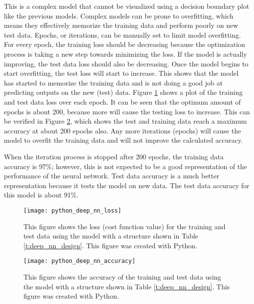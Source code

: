 This is a complex model that cannot be visualized using a decision boundary plot like the previous models.  Complex models can be prone to overfitting, which means they effectively memorize the training data and perform poorly on new test data.  Epochs, or iterations, can be manually set to limit model overfitting.  For every epoch, the training loss should be decreasing because the optimization process is taking a new step towards minimizing the loss.  If the model is actually improving, the test data loss should also be decreasing.  Once the model begins to start overfitting, the test loss will start to increase.  This shows that the model has started to memorize the training data and is not doing a good job at predicting outputs on the new (test) data.  Figure \ref{fig:python_deep_nn_loss} shows a plot of the training and test data loss over each epoch.  It can be seen that the optimum amount of epochs is about 200, because more will cause the testing loss to increase.  This can be verified in Figure \ref{fig:python_deep_nn_accuracy}, which shows the test and training data reach a maximum accuracy at about 200 epochs also.  Any more iterations (epochs) will cause the model to overfit the training data and will not improve the calculated accuracy.

When the iteration process is stopped after 200 epochs, the training data accuracy is 97\%; however, this is not expected to be a good representation of the performance of the neural network.  Test data accuracy is a much better representation because it tests the model on new data.  The test data accuracy for this model is about 91\%.

\begin{figure}
\centering
\texttt{[image: python\_deep\_nn\_loss]}
\decoRule
\caption{This figure shows the loss (cost function value) for the training and test data using the model with a structure shown in Table \ref{t:deep_nn_design}.  This figure was created with Python.}
\label{fig:python_deep_nn_loss}
\end{figure}

\begin{figure}
\centering
\texttt{[image: python\_deep\_nn\_accuracy]}
\decoRule
\caption{This figure shows the accuracy of the training and test data using the model with a structure shown in Table \ref{t:deep_nn_design}. This figure was created with Python.}
\label{fig:python_deep_nn_accuracy}
\end{figure}

